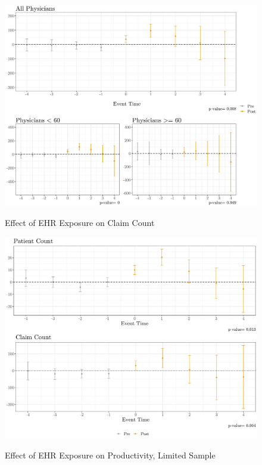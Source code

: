 \documentclass[11pt]{article}
\begin{document}
\begin{figure}[p]
    \centering
    \caption{Effect of EHR Exposure on Claim Count}
    \includegraphics[scale=.4]{Objects/claim_plot.pdf}
    \label{fig:claim}
\end{figure}

\begin{figure}[p]
    \centering
    \caption{Effect of EHR Exposure on Productivity, Limited Sample}
    \includegraphics[scale=.4]{Objects/limitedsample_plot.pdf}
    \label{fig:limitedsample}
\end{figure}
\end{document}
